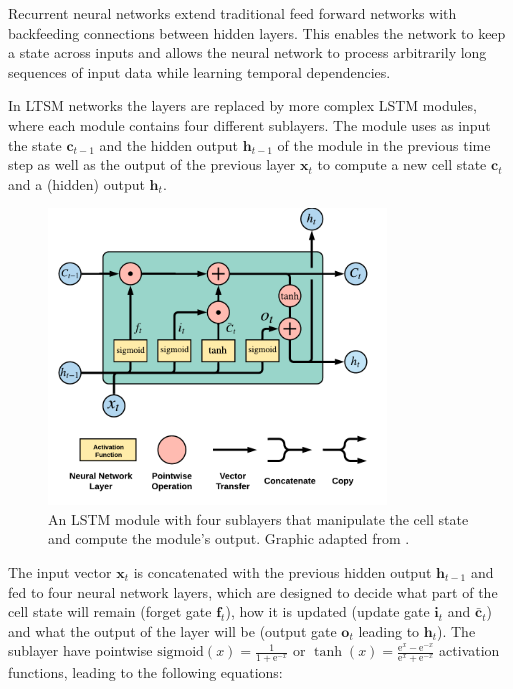 Recurrent neural networks extend traditional feed forward networks with backfeeding connections between hidden layers.
This enables the network to keep a state across inputs and allows the neural network to process arbitrarily long sequences of input data while learning temporal dependencies.

In LTSM networks the layers are replaced by more complex LSTM modules, where each module contains four different sublayers.
The module uses as input the state $\bm{c}_{t-1}$ and the hidden output $\bm{h}_{t-1}$ of the module in the previous time step as well as the output of the previous layer $\bm{x}_t$ to compute a new cell state $\bm{c}_{t}$ and a (hidden) output $\bm{h}_{t}$.

\begin{figure}[htbp!]
	\centering
	\includegraphics[width=0.8\textwidth]{figures/lstm-module}
	\caption{An LSTM module with four sublayers that manipulate the cell state and compute the module's output. Graphic adapted from \cite{lstm-blog}.}
	\label{fig:lstm-module}
\end{figure}


The input vector $\bm{x}_t$ is concatenated with the previous hidden output $\bm{h}_{t-1}$ and fed to four neural network layers, which are designed to decide what part of the cell state will remain (forget gate $\bm{f}_t$), how it is updated (update gate $\bm{i}_t$ and $\bm{\bar{c}}_t$) and what the output of the layer will be (output gate $\bm{o}_t$ leading to $\bm{h}_t$).
The sublayer have pointwise $\text{sigmoid}(x) = \frac{1}{1+\mathrm{e}^{-x}}$ or $\tanh(x) = \frac{\mathrm{e}^{x} - \mathrm{e}^{-x}}{\mathrm{e}^{x} + \mathrm{e}^{-x}}$ activation functions, leading to the following equations:

